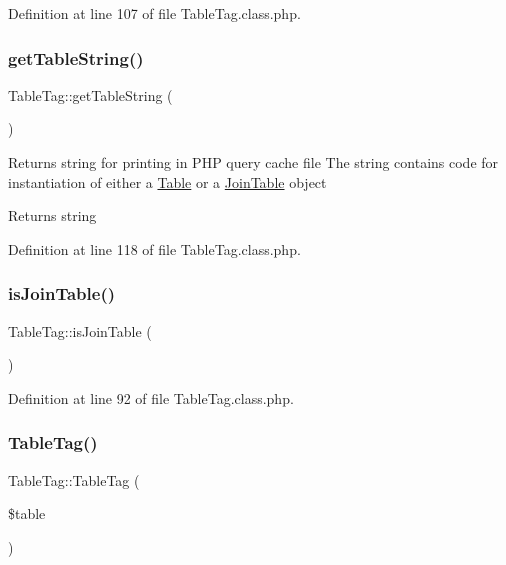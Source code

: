 Definition at line 107 of file Table\+Tag.\+class.\+php.

\mbox{\label{classTableTag_a51d350dda88e10bd240831af89e10fd1}} 
\subsubsection{\texorpdfstring{get\+Table\+String()}{getTableString()}}
{\footnotesize\ttfamily Table\+Tag\+::get\+Table\+String (\begin{DoxyParamCaption}{ }\end{DoxyParamCaption})}

Returns string for printing in P\+HP query cache file The string contains code for instantiation of either a \hyperlink{classTable}{Table} or a \hyperlink{classJoinTable}{Join\+Table} object \begin{DoxyReturn}{Returns}
string 
\end{DoxyReturn}


Definition at line 118 of file Table\+Tag.\+class.\+php.

\mbox{\label{classTableTag_ac27cd91a8df4854bc7598260a030bd7b}} 
\subsubsection{\texorpdfstring{is\+Join\+Table()}{isJoinTable()}}
{\footnotesize\ttfamily Table\+Tag\+::is\+Join\+Table (\begin{DoxyParamCaption}{ }\end{DoxyParamCaption})}



Definition at line 92 of file Table\+Tag.\+class.\+php.

\mbox{\label{classTableTag_a27f151c3ff35cf3a89242ae896fae444}} 
\subsubsection{\texorpdfstring{Table\+Tag()}{TableTag()}}
{\footnotesize\ttfamily Table\+Tag\+::\+Table\+Tag (\begin{DoxyParamCaption}\item[{}]{\$table }\end{DoxyParamCaption})}

